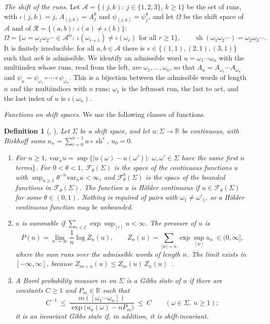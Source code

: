 \documentclass[11pt]{amsart}
\newtheorem{definition}[proposition]{Definition}
\theoremstyle{definition}
\theoremstyle{remark}
\newcommand{\R}{\mathbb R}
\newcommand{\N}{\mathbb N}
\newcommand{\cF}{\mathcal F}
\newcommand{\abs}[1]{\lvert #1\rvert}
\begin{document}
\emph{The shift of the runs.}
Let $\mathcal A=\{(j,k):\ j\in\{1,2,3\},\ k\ge1\}$ be the set of runs, with $\iota(j,k)=j$, $A_{(j,k)}=A_j^k$ and $\psi_{(j,k)}=\psi_j^k$, and let $\Omega$ be the shift space of $\mathcal A$ and of $\mathcal R=\{(a,b):\ \iota(a)\ne\iota(b)\}$:
\[
  \Omega=\bigl\{\omega=\omega_1\omega_2\cdots\in\mathcal A^{\N}:\ \iota(\omega_{r+1})\ne\iota(\omega_r)\text{ for all }r\ge1\bigr\},\qquad
  \operatorname{sh}(\omega_1\omega_2\cdots)=\omega_2\omega_3\cdots .
\]
It is finitely irreducible: for all $a,b\in\mathcal A$ there is $e\in\{(1,1),(2,1),(3,1)\}$ such that $aeb$ is admissible. We identify an admissible word $u=\omega_1\cdots\omega_n$ with the multiindex whose runs, read from the left, are $\omega_1,\dots,\omega_n$, so that $A_u=A_{\omega_1}\cdots A_{\omega_n}$ and $\psi_u=\psi_{\omega_1}\circ\cdots\circ\psi_{\omega_n}$. This is a bijection between the admissible words of length $n$ and the multiindices with $n$ runs; $\omega_1$ is the leftmost run, the last to act, and the last index of $u$ is $\iota(\omega_n)$.

\emph{Functions on shift spaces.}
We use the following classes of functions.

\begin{definition}[{\cite[\S\S2.1--2.2]{MU03}, \cite[\S\S2.1--2.2]{KK16}}]\label{def:shiftfns}
Let $\Sigma$ be a shift space, and let $u:\Sigma\to\R$ be continuous, with Birkhoff sums $u_n=\sum_{r=0}^{n-1}u\circ\operatorname{sh}^r$, $u_0=0$.
\begin{enumerate}
\item[(i)] For $n\ge1$, $\mathrm{var}_nu=\sup\{\abs{u(\omega)-u(\omega')}:\ \omega,\omega'\in\Sigma$ have the same first $n$ terms$\}$. For $0<\theta<1$, $\cF_\theta(\Sigma)$ is the space of the continuous functions $u$ with $\sup_{n\ge1}\theta^{-n}\mathrm{var}_nu<\infty$, and $\cF^b_\theta(\Sigma)$ is the space of the bounded functions in $\cF_\theta(\Sigma)$. The function $u$ is \emph{H\"older continuous} if $u\in\cF_\theta(\Sigma)$ for some $\theta\in(0,1)$. Nothing is required of pairs with $\omega_1\ne\omega'_1$, so a H\"older continuous function may be unbounded.
\item[(ii)] $u$ is \emph{summable} if $\sum_{e\in\mathcal E}\exp\sup_{[e]}u<\infty$. The \emph{pressure} of $u$ is
\[
  P(u)=\lim_{n\to\infty}\frac1n\log Z_n(u),\qquad Z_n(u)=\sum_{\abs w=n}\exp\sup_{[w]}u_n\ \in(0,\infty],
\]
where the sum runs over the admissible words of length $n$. The limit exists in $[-\infty,\infty]$, because $Z_{m+n}(u)\le Z_m(u)\,Z_n(u)$~\cite[Lemmas~2.1.1 and~2.1.2, and (2.1)]{MU03}.
\item[(iii)] A Borel probability measure $m$ on $\Sigma$ is a \emph{Gibbs state} of $u$ if there are constants $C\ge1$ and $P_m\in\R$ such that
\[
  C^{-1}\ \le\ \frac{m([\omega_1\cdots\omega_n])}{\exp\bigl(u_n(\omega)-nP_m\bigr)}\ \le\ C\qquad(\omega\in\Sigma,\ n\ge1);
\]
it is an \emph{invariant Gibbs state} if, in addition, it is shift-invariant.
\end{enumerate}
\end{definition}
\end{document}
